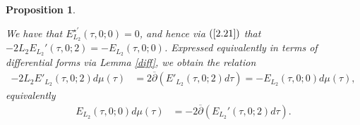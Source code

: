 \documentclass{amsart}
\newtheorem{proposition}[theorem]{Proposition}
\theoremstyle{definition}
\begin{document}
\begin{proposition}\label{vanish}

We have that $E^{\star \prime}_{L_2}(\tau, 0;0) =0$, and hence via $(\ref{2.21})$ that 
$- 2 L_2 E_{L_2}'(\tau, 0; 2) = - E_{L_2}(\tau, 0; 0)$.
Expressed equivalently in terms of differential forms via Lemma \ref{diff}, we obtain the relation
\begin{align*} - 2 L_2 E'_{L_2}(\tau,0; 2) d \mu(\tau) &= 2 \overline{\partial} \left( E'_{L_2}(\tau, 0; 2) d \tau \right)
= - E_{L_2}(\tau, 0; 0) d\mu(\tau), \end{align*} equivalently 
\begin{equation}\begin{aligned}\label{2.23} E_{L_2}(\tau, 0; 0) d \mu(\tau) 
&= - 2 \overline{\partial} \left( E_{L_2}'(\tau, 0; 2) d \tau \right) . \end{aligned} \end{equation}
\end{proposition}
\end{document}
